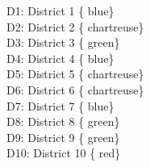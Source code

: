 \documentclass{article}
\begin{document}
D1: District 1 \left\{ {blue}\right\} \\
D2: District 2 \left\{ {chartreuse}\right\} \\
D3: District 3 \left\{ {green}\right\} \\
D4: District 4 \left\{ {blue}\right\} \\
D5: District 5 \left\{ {chartreuse}\right\} \\
D6: District 6 \left\{ {chartreuse}\right\} \\
D7: District 7 \left\{ {blue}\right\} \\
D8: District 8 \left\{ {green}\right\} \\
D9: District 9 \left\{ {green}\right\} \\
D10: District 10 \left\{ {red}\right\} \\
\end{document}
